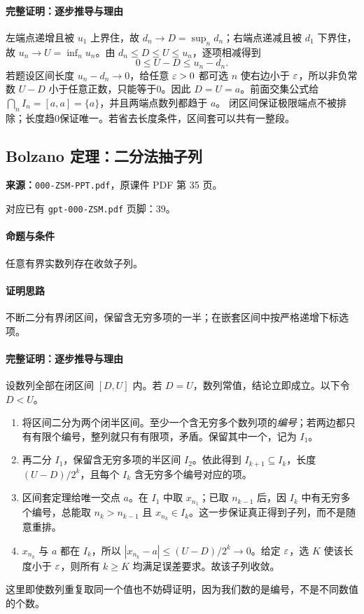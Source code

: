 \paragraph{完整证明：逐步推导与理由}

左端点递增且被 $u_1$ 上界住，故 $d_n\to D=\sup_n d_n$；右端点递减且被 $d_1$ 下界住，故 $u_n\to U=\inf_n u_n$。由 $d_n\le D\le U\le u_n$，逐项相减得到
\[0\le U-D\le u_n-d_n.\]
若题设区间长度 $u_n-d_n\to0$，给任意 $\varepsilon>0$ 都可选 $n$ 使右边小于 $\varepsilon$，所以非负常数 $U-D$ 小于任意正数，只能等于0。因此 $D=U=a$。前面交集公式给 $\bigcap_nI_n=[a,a]=\{a\}$，并且两端点数列都趋于 $a$。
闭区间保证极限端点不被排除；长度趋0保证唯一。若省去长度条件，区间套可以共有一整段。

\clearpage\subsection{Bolzano 定理：二分法抽子列}
\textbf{来源：}\texttt{000-ZSM-PPT.pdf}，原课件 PDF 第 35 页。\par
对应已有 \texttt{gpt-000-ZSM.pdf} 页脚：39。\par
\paragraph{命题与条件}任意有界实数列存在收敛子列。
\paragraph{证明思路}不断二分有界闭区间，保留含无穷多项的一半；在嵌套区间中按严格递增下标选项。
\paragraph{完整证明：逐步推导与理由}

设数列全部在闭区间 $[D,U]$ 内。若 $D=U$，数列常值，结论立即成立。以下令 $D<U$。
\begin{enumerate}
\item 将区间二分为两个闭半区间。至少一个含无穷多个数列项的\emph{编号}；若两边都只有有限个编号，整列就只有有限项，矛盾。保留其中一个，记为 $I_1$。
\item 再二分 $I_1$，保留含无穷多项的半区间 $I_2$。依此得到 $I_{k+1}\subseteq I_k$，长度 $(U-D)/2^k$，且每个 $I_k$ 含无穷多个编号对应的项。
\item 区间套定理给唯一交点 $a$。在 $I_1$ 中取 $x_{n_1}$；已取 $n_{k-1}$ 后，因 $I_k$ 中有无穷多个编号，总能取 $n_k>n_{k-1}$ 且 $x_{n_k}\in I_k$。这一步保证真正得到子列，而不是随意重排。
\item $x_{n_k}$ 与 $a$ 都在 $I_k$，所以 $|x_{n_k}-a|\le(U-D)/2^k\to0$。给定 $\varepsilon$，选 $K$ 使该长度小于 $\varepsilon$，则所有 $k\ge K$ 均满足误差要求。故该子列收敛。
\end{enumerate}
这里即使数列重复取同一个值也不妨碍证明，因为我们数的是编号，不是不同数值的个数。

